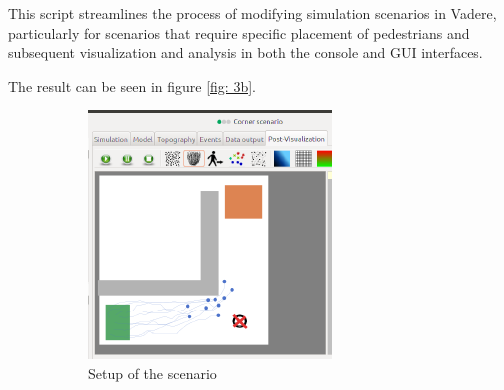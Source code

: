 This script streamlines the process of modifying simulation scenarios in Vadere, particularly for scenarios that require specific placement of pedestrians and subsequent visualization and analysis in both the console and GUI interfaces.

The result can be seen in figure \ref{fig: 3b}.

\begin{figure}[H]
 \centering
 \begin{subfigure}[b]{0.4\textwidth}
     \centering
     \includegraphics[width=\textwidth]{images/task3(goal).png}
    \caption{Setup of the scenario}
    \label{fig: 3a}
 \end{subfigure}
 \begin{subfigure}[b]{0.4\textwidth}
      \centering

\end{subfigure}
\end{figure}

